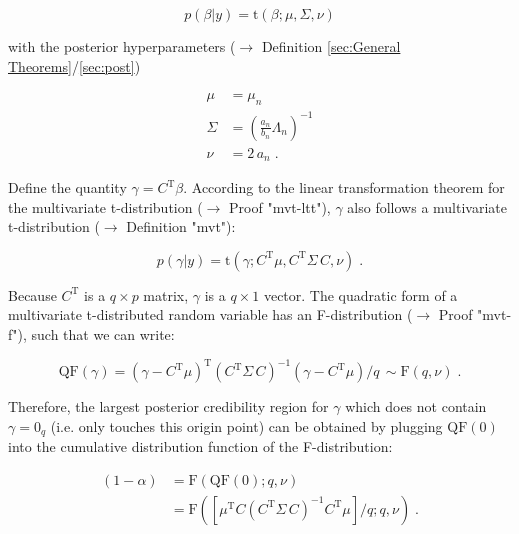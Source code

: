 \documentclass[a4paper,12pt,twoside]{book}
\begin{document}
\begin{equation} \label{eq:blr-pcr-GLM-NG-post-beta}
p(\beta|y) = \mathrm{t}(\beta; \mu, \Sigma, \nu)
\end{equation}

with the posterior hyperparameters ($\rightarrow$ Definition \ref{sec:General Theorems}/\ref{sec:post})

\begin{equation} \label{eq:blr-pcr-GLM-NG-post-par-beta}
\begin{split}
\mu &= \mu_n \\
\Sigma &= \left( \frac{a_n}{b_n} \Lambda_n \right)^{-1} \\
\nu &= 2 \, a_n \; .
\end{split}
\end{equation}

Define the quantity $\gamma = C^\mathrm{T} \beta$. According to the linear transformation theorem for the multivariate t-distribution ($\rightarrow$ Proof "mvt-ltt"), $\gamma$ also follows a multivariate t-distribution ($\rightarrow$ Definition "mvt"):

\begin{equation} \label{eq:blr-pcr-GLM-NG-post-gamma}
p(\gamma|y) = \mathrm{t}(\gamma; C^\mathrm{T} \mu, C^\mathrm{T} \Sigma \, C, \nu) \; .
\end{equation}

Because $C^\mathrm{T}$ is a $q \times p$ matrix, $\gamma$ is a $q \times 1$ vector. The quadratic form of a multivariate t-distributed random variable has an F-distribution ($\rightarrow$ Proof "mvt-f"), such that we can write:

\begin{equation} \label{eq:blr-pcr-GLM-NG-post-qf}
\mathrm{QF}(\gamma) = (\gamma - C^\mathrm{T} \mu)^\mathrm{T} (C^\mathrm{T} \Sigma \, C)^{-1} (\gamma - C^\mathrm{T} \mu) /q \, \sim \mathrm{F}(q,\nu) \; .
\end{equation}

Therefore, the largest posterior credibility region for $\gamma$ which does not contain $\gamma = 0_q$ (i.e. only touches this origin point) can be obtained by plugging $\mathrm{QF}(0)$ into the cumulative distribution function of the F-distribution:

\begin{equation} \label{eq:blr-pcr-GLM-NG-post-cred-reg-not-H0}
\begin{split}
(1-\alpha) &= \mathrm{F}\left( \mathrm{QF}(0); q, \nu \right) \\
&= \mathrm{F}\left( \left[ \mu^\mathrm{T} C (C^\mathrm{T} \Sigma \, C)^{-1} C^\mathrm{T} \mu \right]/q; q, \nu \right) \; .
\end{split}
\end{equation}
\end{document}
